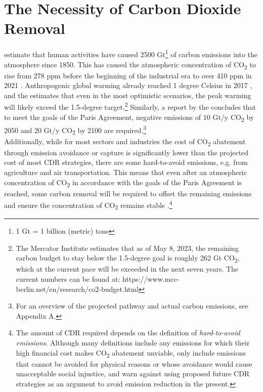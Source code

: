 \section{The Necessity of Carbon Dioxide Removal}
\textcite{Bergman2021TheJustice} estimate that human activities have caused 2500 Gt\footnote{ 1 Gt = 1 billion (metric) tons} of carbon emissions into the atmosphere since 1850. This has caused the atmospheric concentration of CO\textsubscript{2} to rise from 278 ppm before the beginning of the industrial era to over 410 ppm in 2021 \parencite{Friedlingstein2022Global2022}. Anthropogenic global warming already reached 1 degree Celsius in 2017 \parencite[6]{IPCC2018Global1.5C}, and the \textcite[30]{UNEP2022Emissions2022} estimates that even in the most optimistic scenarios, the peak warming will likely exceed the 1.5-degree target.\footnote{The Mercator Institute estimates that as of May 8, 2023, the remaining carbon budget to stay below the 1.5-degree goal is roughly 262 Gt CO\textsubscript{2}, which at the current pace will be exceeded in the next seven years. The current numbers can be found at: https://www.mcc-berlin.net/en/research/co2-budget.html} Similarly, a report by the \textcite[9]{NAS2018NegativeAgenda} concludes that to meet the goals of the Paris Agreement, negative emissions of 10 Gt/y CO\textsubscript{2} by 2050 and 20 Gt/y CO\textsubscript{2} by 2100 are required.\footnote{For an overview of the projected pathway and actual carbon emissions, see Appendix A.}\\
Additionally, while for most sectors and industries the cost of CO\textsubscript{2} abatement through emission avoidance or capture is significantly lower than the projected cost of most CDR strategies, there are some hard-to-avoid emissions, e.g. from agriculture and air transportation. This means that even after an atmospheric concentration of CO\textsubscript{2} in accordance with the goals of the Paris Agreement is reached, some carbon removal will be required to offset the remaining emissions and ensure the concentration of CO\textsubscript{2} remains stable \parencite{NRC2015ClimateSequestration}.\footnote{The amount of CDR required depends on the definition of \textit{hard-to-avoid emissions}. Although many definitions include any emissions for which their high financial cost makes CO\textsubscript{2} abatement unviable, \textcite{Bergman2021TheJustice} only include emissions that cannot be avoided for physical reasons or whose avoidance would cause unacceptable social injustice, and warn against using proposed future CDR strategies as an argument to avoid emission reduction in the present.}

